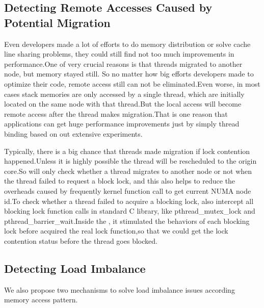 
\subsection{Detecting Remote Accesses Caused by Potential Migration} 
Even developers made a lot of efforts to do memory distribution or solve cache line sharing problems, they could still find not too much improvements in performance.One of very crucial reasons is that threads migrated to another node, but memory stayed still. So no matter how big efforts developers made to optimize their code, remote access still can not be eliminated.Even worse, in most cases stack memories are only accessed by a single thread, which are initially located on the same node with that thread.But the local access will become remote access after the thread makes migration.That is one reason that applications can get huge performance improvements just by simply thread binding based on out extensive experiments.

Typically, there is a big chance that threads made migration if lock contention happened.Unless it is highly possible the thread will be rescheduled to the origin core.So \NP{} will only check whether a thread migrates to another node or not when the thread failed to request a block lock, and this also helps to reduce the overheads caused by frequently kernel function call to get current NUMA node id.To check whether a thread failed to acquire a blocking lock, \NP{} also intercept all blocking lock function calls in standard C library, like pthread\_mutex\_lock and pthread\_barrier\_wait.Inside the \NP{}, it stimulated the behaviors of each blocking lock before acquired the real lock function,so that we could get the lock contention status before the thread goes blocked.

\subsection{Detecting Load Imbalance}
We also propose two mechanisms to solve load imbalance issues according memory access pattern.



